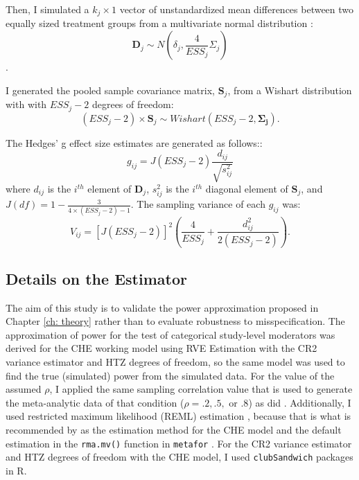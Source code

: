 Then, I simulated a $k_j \times 1$ vector of unstandardized mean differences between two equally sized treatment groups from a multivariate normal distribution \autocite{pustejovsky2022}:
\begin{equation}
    \mathbf{D}_j \sim N(\delta_j, \frac{4}{ESS_j}\Sigma_j)
\end{equation}.

I generated the pooled sample covariance matrix, $\mathbf{S}_j$,  from a Wishart distribution with with $ESS_j -2$ degrees of freedom:
\begin{equation}
    (ESS_j -2) \times \mathbf{S}_j \sim Wishart(ESS_j - 2, \mathbf{\Sigma_j}).
\end{equation}

The Hedges' g effect size estimates are generated as follows::
\begin{equation}
    g_{ij} = J\left(ESS_j-2\right) \frac{d_{ij}}{\sqrt{s^2_{ij}}} 
\end{equation}
where $d_{ij}$ is the $i^{th}$ element of $\mathbf{D}_j$, $s^2_{ij}$ is the $i^{th}$ diagonal element of $\mathbf{S}_j$, and $J(df) = 1 - \frac{3}{4 \times (ESS_j -2) -1}$. The sampling variance of each $g_{ij}$ was:
\begin{equation}
    V_{ij} = \left[  J\left(ESS_j-2\right)\right]^2 \left( \frac{4}{ESS_j} + \frac{d^2_{ij}}{2(ESS_j -2)}\right).
\end{equation}


\subsection{Details on the Estimator}

The aim of this study is to validate the power approximation proposed in Chapter \ref{ch: theory} rather than to evaluate robustness to misspecification. The approximation of power for the test of categorical study-level moderators was derived for the CHE working model using RVE Estimation with the CR2 variance estimator and HTZ degrees of freedom, so the same model was used to find the true (simulated) power from the simulated data. For the value of the assumed $\rho$, I applied the same sampling correlation value that is used to generate the meta-analytic data of that condition ($\rho=.2, .5,$ or $.8$) as did \textcite{vembye2023}. Additionally, I used restricted maximum likelihood (REML) estimation \autocite{viechtbauer2015, viechtbauer2005}, because that is what is recommended by \textcite{pustejovsky2022} as the estimation method for the CHE model and the default estimation in the \texttt{rma.mv()} function in \texttt{metafor} \autocite{viechtbauer2010a}. For the CR2 variance estimator and HTZ degrees of freedom with the CHE model, I used \texttt{clubSandwich} \textcite{pustejovsky2024a} packages in R.


